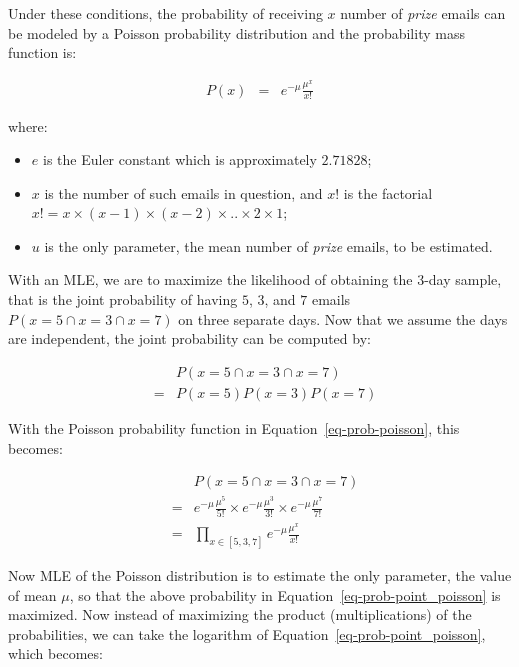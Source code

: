 \documentclass[
  letterpaper,
]{scrbook}
\begin{document}
Under these conditions, the probability of receiving \(x\) number of
\emph{prize} emails can be modeled by a Poisson probability distribution
and the probability mass function is:

\[\begin{aligned}
P(x) & = & e^{-\mu} \frac{\mu^x}{x!}
\end{aligned}\]

where:

\begin{itemize}
\item
  \(e\) is the Euler constant which is approximately \(2.71828\);
\item
  \(x\) is the number of such emails in question, and \(x!\) is the
  factorial
  \(x!=x \times (x-1) \times (x-2) \times .. \times 2 \times 1\);
\item
  \(u\) is the only parameter, the mean number of \emph{prize} emails,
  to be estimated.
\end{itemize}

With an MLE, we are to maximize the likelihood of obtaining the 3-day
sample, that is the joint probability of having \(5\), \(3\), and \(7\)
emails \(P(x=5 \cap x=3 \cap x=7)\) on three separate days. Now that we
assume the days are independent, the joint probability can be computed
by:

\[\begin{aligned}
  & & P(x=5 \cap x=3 \cap x=7) \\
  & = & P(x=5) P(x=3) P(x=7)
\end{aligned}\]

With the Poisson probability function in
Equation~\hyperref[eq-prob-poisson]{{[}eq-prob-poisson{]}}, this
becomes:

\[\begin{aligned}
  &   & P(x=5 \cap x=3 \cap x=7) \\
  & = & e^{-\mu}\frac{\mu^5}{5!} \times e^{-\mu}\frac{\mu^3}{3!} \times e^{-\mu}\frac{\mu^7}{7!} \\
  & = & \prod_{x \in [5,3,7]} e^{-\mu} \frac{\mu^x}{x!}
\end{aligned}\]

Now MLE of the Poisson distribution is to estimate the only parameter,
the value of mean \(\mu\), so that the above probability in
Equation~\hyperref[eq-prob-point_poisson]{{[}eq-prob-point\_poisson{]}}
is maximized. Now instead of maximizing the product (multiplications) of
the probabilities, we can take the logarithm of
Equation~\hyperref[eq-prob-point_poisson]{{[}eq-prob-point\_poisson{]}},
which becomes:
\end{document}
